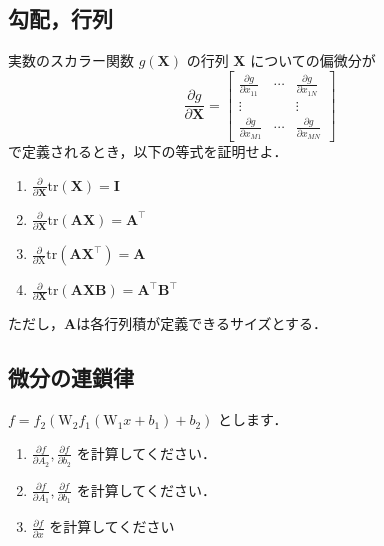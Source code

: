 \subsection{勾配，行列}
  実数のスカラー関数 $g(\mathbf X)$ の行列 $\mathbf X$ についての偏微分が
  \begin{equation}
    \frac{\partial g}{\partial \mathbf X} =
    \begin{bmatrix}
      \displaystyle
      \frac{\partial g}{\partial x_{11}}&\cdots&\displaystyle \frac{\partial g}{\partial x_{1N}}\\
      \vdots& &\vdots\\
      \displaystyle \frac{\partial g}{\partial x_{M1}}&\cdots&\displaystyle \frac{\partial g}{\partial x_{MN}}
    \end{bmatrix}
  \end{equation}
  で定義されるとき，以下の等式を証明せよ．
  \begin{enumerate}[label=(\roman*)]
    \item $\frac{\partial}{\partial \mathbf{X}}{\mathrm{tr}}(\mathbf{X})={\mathbf{I}}$
    \item $\frac{\partial}{\partial \mathbf{X}}{\mathrm{tr}}({\mathbf{A}}{\mathbf{X}})={\mathbf{A}}^{\top}$
    \item $\frac{\partial}{\partial \mathrm{X}}{\mathrm{tr}}({\mathbf{A}}{\mathbf{X}}^{\top})={\mathbf{A}}$
    \item $\frac{\partial}{\partial \mathbf{X}}{\mathrm{tr}}({\mathbf{A}}{\mathbf{X}}{\mathbf{B}})={\mathbf{A}}^{\top}{\mathbf{B}}^{\top}$
  \end{enumerate}
  ただし，$\mathbf{A}$は各行列積が定義できるサイズとする．

\subsection{微分の連鎖律}
  $f = f_2(\mathrm{W}_2 f_1(\mathrm{W}_1 x + b_1) + b_2)$ とします．
  \begin{enumerate}[label=(\roman*)]
    \item $\frac{\partial f}{\partial A_2}, \frac{\partial f}{\partial b_2}$ を計算してください．
    \item $\frac{\partial f}{\partial A_1}, \frac{\partial f}{\partial b_1}$ を計算してください．
    \item $\frac{\partial f}{\partial x}$ を計算してください
  \end{enumerate}

